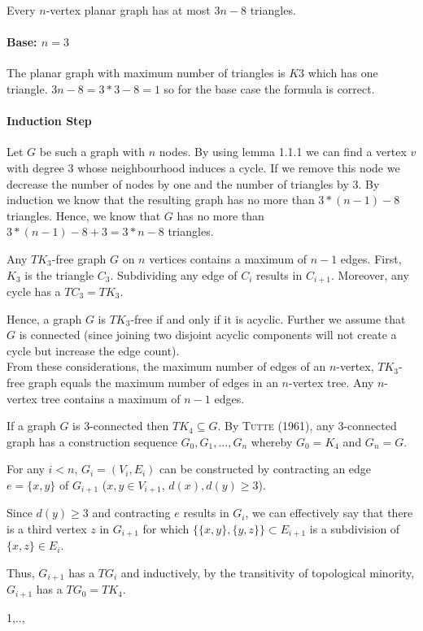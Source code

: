 \documentclass[a4paper]{article}
\begin{document}
\begin{solution}{21}
\begin{theorem}{Every $n$-vertex planar graph has at most $3n-8$ triangles.}
		\paragraph{Base: $n=3$}
		The planar graph with maximum number of triangles is $K3$ which has one triangle. 
		$3n-8 = 3*3-8 = 1$ so for the base case the formula is correct.  
		\paragraph{Induction Step}
		Let $G$ be such a graph with $n$ nodes. 
		By using lemma 1.1.1 we can find a vertex $v$ with degree 3 whose neighbourhood induces a cycle.
		If we remove this node we decrease the number of nodes by one and the number of triangles by 3. 
		By induction we know that the resulting graph has no more than $3*(n-1) -8$ triangles. 
		Hence, we know that $G$ has no more than $3*(n-1) -8 + 3 = 3*n-8$ triangles. 
		\end{theorem}
	\end{solution}
	\newpage
	\begin{solution}{22}
		\begin{theorem}{Any $TK_3$-free graph $G$ on $n$ vertices contains a maximum of $n-1$ edges.}
			First, $K_3$ is the triangle $C_3$. Subdividing any edge of $C_i$ results in $C_{i+1}$. Moreover, any cycle has a $TC_3 = TK_3$.
			
			Hence, a graph $G$ is $TK_3$-free if and only if it is acyclic. Further we assume that $G$ is connected (since joining two disjoint acyclic components will not create a cycle but increase the edge count).\\

			From these considerations, the maximum number of edges of an $n$-vertex, $TK_3$-free graph equals the maximum number of edges in an $n$-vertex tree. Any $n$-vertex tree contains a maximum of $n - 1$ edges.
		\end{theorem}

		\begin{theorem}{If a graph $G$ is $3$-connected then $TK_4 \subseteq G$.}
			By \textsc{Tutte (1961)}, any $3$-connected graph has a construction sequence $G_0, G_1, ..., G_n$ whereby $G_0 = K_4$ and $G_n = G$.

			For any $i < n$, $G_i = (V_i, E_i)$ can be constructed by contracting an edge $e = \{x, y\}$ of $G_{i+1}$ ($x, y \in V_{i+1}$, $d(x), d(y) \geq 3$).

			Since $d(y) \geq 3$ and contracting $e$ results in $G_i$, we can effectively say that there is a third vertex $z$ in $G_{i+1}$ for which $\{\{x,y\}, \{y, z\}\} \subset E_{i+1}$ is a subdivision of $\{x,z\} \in E_i$.

			Thus, $G_{i+1}$ has a $TG_{i}$ and inductively, by the transitivity of topological minority, $G_{i+1}$ has a $TG_0 = TK_4$.
		\end{theorem}
	\end{solution}
1,..,
\end{document}
